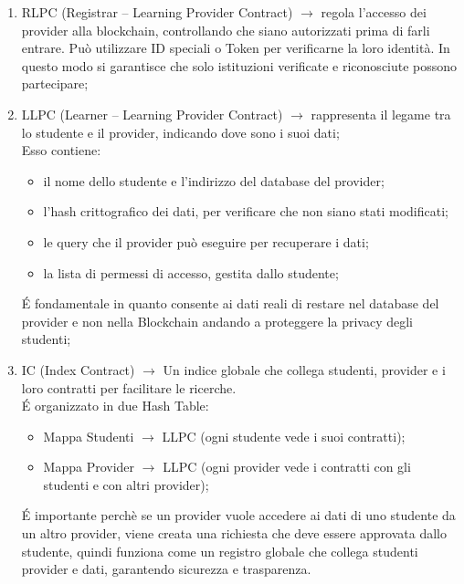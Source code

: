 \begin{enumerate}
    \item RLPC (Registrar – Learning Provider Contract) $\rightarrow$ regola l’accesso dei provider alla blockchain, controllando che siano autorizzati prima di farli entrare. Può utilizzare ID speciali o Token per verificarne la loro identità. In questo modo si garantisce che solo istituzioni verificate e riconosciute possono partecipare;
    \item LLPC (Learner – Learning Provider Contract) $\rightarrow$ rappresenta il legame tra lo studente e il provider, indicando dove sono i suoi dati;
          \\Esso contiene:
            \begin{itemize}
                \item il nome dello studente e l'indirizzo del database del provider;
                \item l’hash crittografico dei dati, per verificare che non siano stati modificati;
                \item le query che il provider può eseguire per recuperare i dati;
                \item la lista di permessi di accesso, gestita dallo studente;
            \end{itemize}
            \'E fondamentale in quanto consente ai dati reali di restare nel database del provider e non nella Blockchain andando a proteggere la privacy degli studenti;
    \item IC (Index Contract) $\rightarrow$ Un indice globale che collega studenti, provider e i loro contratti per facilitare le ricerche.
            \\\'E organizzato in due Hash Table:
            \begin{itemize}
                \item Mappa Studenti $\rightarrow$ LLPC (ogni studente vede i suoi contratti);
                \item Mappa Provider $\rightarrow$ LLPC (ogni provider vede i contratti con gli studenti e con altri provider);
            \end{itemize}
            \'E importante perchè se un provider vuole accedere ai dati di uno studente da un altro provider, viene creata una richiesta che deve essere approvata dallo studente, quindi funziona come un registro globale che collega studenti provider e dati, garantendo sicurezza e trasparenza.
\end{enumerate}